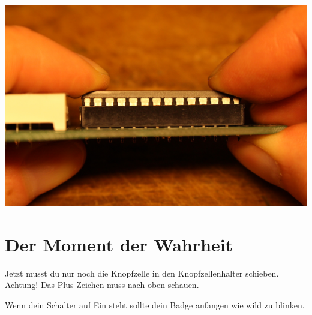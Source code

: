 \documentclass{article}
\begin{document}
\begin{minipage}[b]{0.5\textwidth}
	\includegraphics[width=\textwidth]{Bilder2021/IMG_8170.JPG}
\end{minipage}

\section{Der Moment der Wahrheit}

Jetzt musst du nur noch die Knopfzelle in den Knopfzellenhalter schieben.
Achtung! Das Plus-Zeichen muss nach oben schauen.

Wenn dein Schalter auf Ein steht sollte dein Badge anfangen wie wild zu blinken.

\vspace{1cm}
\end{document}
